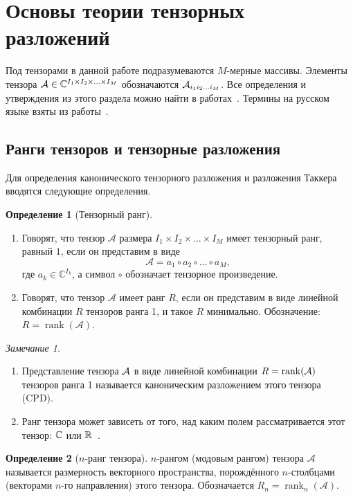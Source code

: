 \documentclass[specialist,
  substylefile=spbu_report.rtx,
subf,href,colorlinks=true, 12pt]{disser}
\theoremstyle{plain}
\theoremstyle{definition}
\newtheorem{definition}{Определение}[section]
\theoremstyle{remark}
\newtheorem*{remark}{Замечание}
\begin{document}
\section{Основы теории тензорных разложений}\label{sec:tensor-decompositions}
Под тензорами в данной работе подразумеваются $M$-мерные массивы.
Элементы тензора $\mathcal{A} \in \mathbb{C}^{I_1 \times I_2 \times \ldots \times I_M}$ обозначаются
$\mathcal{A}_{i_1 i_2 \ldots i_M}$.
Все определения и утверждения из этого раздела можно найти в
работах~\cite{hosvd, tensor-bg, tensor-bg2, tensor-bg3}.
Термины на русском языке взяты из работы~\cite{tensor-rus}.

\subsection{Ранги тензоров и тензорные разложения}\label{subsec:tensor-ranks}
Для определения канонического тензорного разложения и разложения Таккера вводятся следующие определения.
\begin{definition}[Тензорный ранг]
  \leavevmode
  \begin{enumerate}
    \item Говорят, что тензор $\mathcal{A}$ размера $I_1\times I_2\times \ldots \times I_M$ имеет тензорный ранг, равный $1$, если он представим в виде
      \[
        \mathcal{A}=a_1\circ a_2\circ \ldots \circ a_M,
      \]
      где $a_{k} \in \mathbb{C}^{I_k}$, а символ $\circ$ обозначает тензорное произведение.
    \item Говорят, что тензор $\mathcal{A}$ имеет ранг $R$, если он представим в виде линейной комбинации $R$ тензоров
      ранга 1, и такое $R$ минимально.
      Обозначение: $R=\operatorname{rank}(\mathcal{A})$.
  \end{enumerate}
\end{definition}
\begin{remark}
  \begin{enumerate}
    \item Представление тензора $\mathcal{A}$ в виде линейной комбинации $R = \operatorname{rank}(\mathcal{A})$ тензоров ранга 1 называется каноническим разложением этого тензора (CPD).
    \item Ранг тензора может зависеть от того, над каким полем рассматривается этот тензор:
      $\mathbb{C}$ или $\mathbb{R}$~\cite{tensor-bg}.
  \end{enumerate}
\end{remark}

\begin{definition}[$n$-ранг тензора]
  $n$-рангом (модовым рангом) тензора $\mathcal{A}$ называется размерность векторного пространства, порождённого
  $n$-столбцами (векторами $n$-го направления) этого тензора.
  Обозначается $R_n=\operatorname{rank}_{n}(\mathcal{A})$.
\end{definition}
\end{document}
